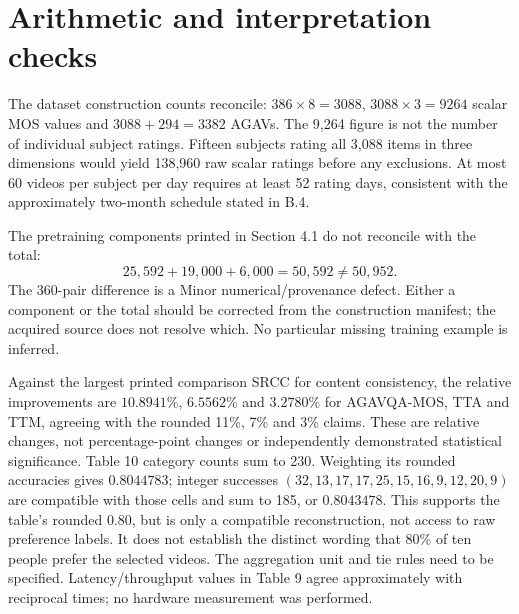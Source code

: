 \documentclass[10pt]{article}
\begin{document}
\section*{Arithmetic and interpretation checks}
The dataset construction counts reconcile: \(386\times8=3088\), \(3088\times3=9264\) scalar MOS values and \(3088+294=3382\) AGAVs. The 9,264 figure is not the number of individual subject ratings. Fifteen subjects rating all 3,088 items in three dimensions would yield 138,960 raw scalar ratings before any exclusions. At most 60 videos per subject per day requires at least 52 rating days, consistent with the approximately two-month schedule stated in B.4.\par
The pretraining components printed in Section 4.1 do not reconcile with the total: \[25,592+19,000+6,000=50,592\ne50,952.\] The 360-pair difference is a Minor numerical/provenance defect. Either a component or the total should be corrected from the construction manifest; the acquired source does not resolve which. No particular missing training example is inferred.\par
Against the largest printed comparison SRCC for content consistency, the relative improvements are \(10.8941\%\), \(6.5562\%\) and \(3.2780\%\) for AGAVQA-MOS, TTA and TTM, agreeing with the rounded 11\%, 7\% and 3\% claims. These are relative changes, not percentage-point changes or independently demonstrated statistical significance. Table 10 category counts sum to 230. Weighting its rounded accuracies gives \(0.8044783\); integer successes \((32,13,17,17,25,15,16,9,12,20,9)\) are compatible with those cells and sum to 185, or \(0.8043478\). This supports the table’s rounded 0.80, but is only a compatible reconstruction, not access to raw preference labels. It does not establish the distinct wording that 80\% of ten people prefer the selected videos. The aggregation unit and tie rules need to be specified. Latency/throughput values in Table 9 agree approximately with reciprocal times; no hardware measurement was performed.\par
\end{document}
